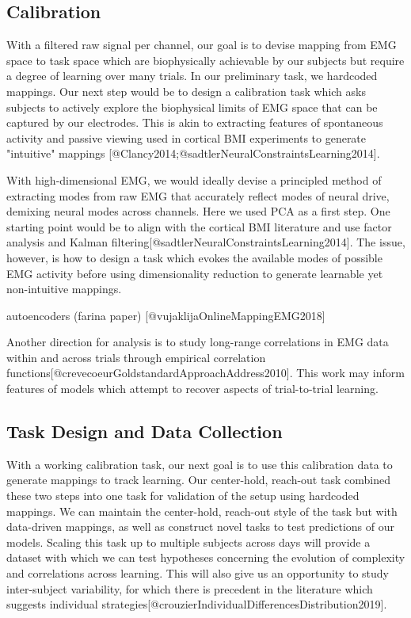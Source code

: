 \documentclass[../main.tex]{subfiles}
\begin{document}
\subsection{Calibration}

With a filtered raw signal per channel, our goal is to devise mapping from EMG space to task space which are biophysically achievable by our subjects but require a degree of learning over many trials. In our preliminary task, we hardcoded mappings. Our next step would be to design a calibration task which asks subjects to actively explore the biophysical limits of EMG space that can be captured by our electrodes. This is akin to extracting features of spontaneous activity and passive viewing used in cortical BMI experiments to generate "intuitive" mappings [@Clancy2014;@sadtlerNeuralConstraintsLearning2014].

With high-dimensional EMG, we would ideally devise a principled method of extracting modes from raw EMG that accurately reflect modes of neural drive, demixing neural modes across channels. Here we used PCA as a first step. One starting point would be to align with the cortical BMI literature and use factor analysis and Kalman filtering[@sadtlerNeuralConstraintsLearning2014]. The issue, however, is how to design a task which evokes the available modes of possible EMG activity before using dimensionality reduction to generate learnable yet non-intuitive mappings.

 autoencoders (farina paper) [@vujaklijaOnlineMappingEMG2018]  

 Another direction for analysis is to study long-range correlations in EMG data within and across trials through empirical correlation functions[@crevecoeurGoldstandardApproachAddress2010]. This work may inform features of models which attempt to recover aspects of trial-to-trial learning. 

\subsection{Task Design and Data Collection}

With a working calibration task, our next goal is to use this calibration data to generate mappings to track learning. Our center-hold, reach-out task combined these two steps into one task for validation of the setup using hardcoded mappings. We can maintain the center-hold, reach-out style of the task but with data-driven mappings, as well as construct novel tasks to test predictions of our models. Scaling this task up to multiple subjects across days will provide a dataset with which we can test hypotheses concerning the evolution of complexity and correlations across learning. This will also give us an opportunity to study inter-subject variability, for which there is precedent in the literature which suggests individual strategies[@crouzierIndividualDifferencesDistribution2019].
\end{document}
